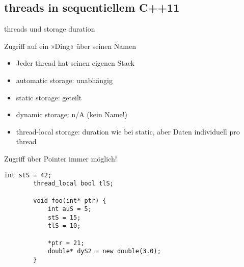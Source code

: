 \subsection{threads in sequentiellem C++11}

\begin{frame}[fragile]{threads und storage duration}
	\footnotesize
	\vspace{-0.5em}
	
	\begin{block}{\footnotesize Zugriff auf ein »Ding« über seinen Namen}
		\begin{itemize}
			\item Jeder thread hat seinen eigenen Stack
			\item automatic storage: unabhängig
			\item static storage: geteilt
			\item dynamic storage: n/A (kein Name!)
			\item thread-local storage: duration wie bei static, aber Daten individuell pro thread
		\end{itemize}
	\end{block}
	\alert<1>{Zugriff über Pointer immer möglich!}
	
	\pause
	
	\begin{lstlisting}[basicstyle=\scriptsize]
		int stS = 42;
		thread_local bool tlS;
		
		void foo(int* ptr) {
			int auS = 5;
			stS = 15;
			tlS = 10;
			
			*ptr = 21;
			double* dyS2 = new double(3.0);
		}
	\end{lstlisting}
\end{frame}

